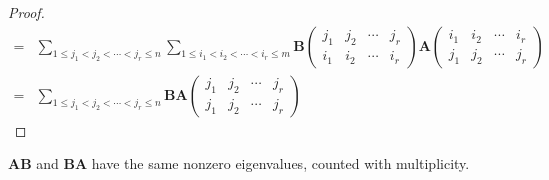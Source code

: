 \documentclass[12pt, a4paper, oneside]{book}
\begin{document}
\begin{theorem}
\begin{proof}
\[\begin{aligned}
                = & \sum_{1 \leq j_1<j_2<\cdots<j_r \leq n} \sum_{1 \leq i_1<i_2<\cdots<i_r \leq m} \mathbf{B}\left(\begin{array}{lllll}
                                                                                                                            j_1 & j_2 & \cdots & j_r \\
                                                                                                                            i_1 & i_2 & \cdots & i_r
                                                                                                                        \end{array}\right) \mathbf{A}\left(\begin{array}{llll}
                                                                                                                                                               i_1 & i_2 & \cdots & i_r \\
                                                                                                                                                               j_1 & j_2 & \cdots & j_r
                                                                                                                                                           \end{array}\right) \\
                = & \sum_{1 \leq j_1<j_2<\cdots<j_r \leq n} {\mathbf{B} \mathbf{A}}\left(\begin{array}{llll}
                                                                                                 j_1 & j_2 & \cdots & j_r \\
                                                                                                 j_1 & j_2 & \cdots & j_r
                                                                                             \end{array}\right)
            \end{aligned}
        \]
    \end{proof}
\end{theorem}

\begin{corollary}
    $\mathbf{A}\mathbf{B}$ and $\mathbf{B}\mathbf{A}$ have the same nonzero eigenvalues, counted with multiplicity.
\end{corollary}
\end{document}
